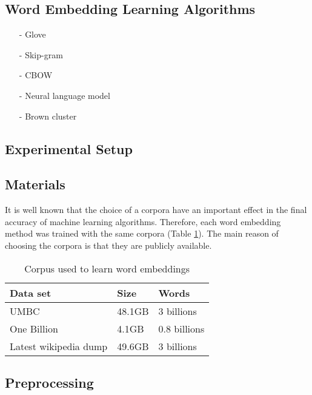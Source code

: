 \documentclass[11pt]{article}
\begin{document}
\subsection{Word Embedding Learning Algorithms}
\begin{itemize}
\item[-] Glove \cite{pennington2014glove}
\item[-] Skip-gram \cite{Mikolov13}
\item[-] CBOW \cite{Mikolov13}
\item[-] Neural language model \cite{Turian10wordrepresentations}
\item[-] Brown cluster \cite{Brown92class-basedn-gram}
\end{itemize}



\subsection{Experimental Setup}

\subsection{Materials}
It is well known that the choice of a corpora have an important effect in the final accuracy of machine learning algorithms. 
Therefore, each word embedding method was trained with the same corpora (Table \ref{corpus}). The main reason of choosing the corpora 
is that they are publicly available. 

\begin{table}[h]
\begin{center}
\begin{small}
\begin{tabular}{lll}
\hline
\textbf{Data set} & \textbf{Size} & \textbf{Words} \\ \hline
UMBC 	& 48.1GB & 3 billions \\
One Billion 	& 4.1GB & 0.8 billions  \\
Latest wikipedia dump & 49.6GB & 3 billions \\
\end{tabular}
\end{small}
\label{corpus}
\caption{Corpus used to learn word embeddings}
\end{center}
\end{table}

\subsection{Preprocessing}
\end{document}
